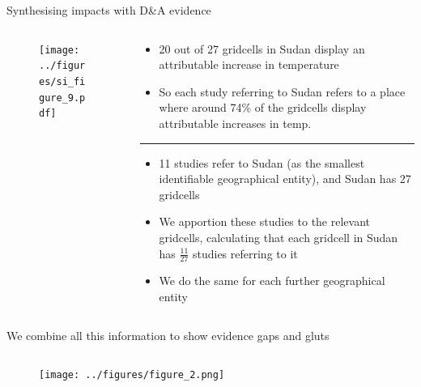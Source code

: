 \documentclass[9pt]{beamer}
\begin{document}
\begin{frame}{Synthesising impacts with D\&A evidence}

\small

\begin{columns}
	\begin{column}{0.6\linewidth}
		\begin{figure}
			\texttt{[image: ../figures/si\_figure\_9.pdf]}
		\end{figure}
	\end{column}
	\begin{column}{0.4\linewidth}
		\begin{itemize}
			\item 20 out of 27 gridcells in Sudan display an attributable increase in temperature
			\item So each study referring to Sudan refers to a place where around 74\% of the gridcells display attributable increases in temp.
		\end{itemize}
				\rule{\linewidth}{0.2pt}
		\begin{itemize}
			\item 11 studies refer to Sudan (as the smallest identifiable geographical entity), and Sudan has 27 gridcells
			\item We apportion these studies to the relevant gridcells, calculating that each gridcell in Sudan has $\frac{11}{27}$ studies referring to it
			\item We do the same for each further geographical entity
		\end{itemize}
		
	\end{column}
\end{columns}

\end{frame}


\begin{frame}{We combine all this information to show evidence gaps and gluts}

\begin{columns}
	\begin{column}{0.9\linewidth}
		\begin{figure}
			\texttt{[image: ../figures/figure\_2.png]}
		\end{figure}
	\end{column}
\end{columns}

\end{frame}
\end{document}
